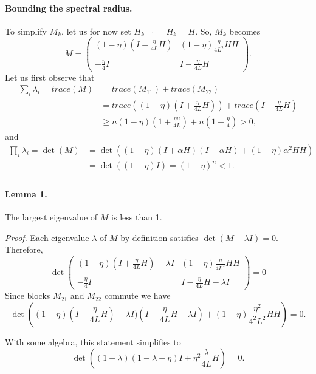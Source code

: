 \documentclass{article}
\begin{document}
\paragraph{Bounding the spectral radius.}
To simplify $M_k$, let us for now set $\bar H_{k-1}=H_k=H$.  So, $M_k$ becomes
\[
M = \begin{pmatrix} (1-\eta)(I+\displaystyle\frac{\eta}{4L} H) & \displaystyle(1-\eta)\frac{\eta}{4L^2} HH\\ 
 \\
                   -\displaystyle\frac{\eta}{4}I  & I-\displaystyle\frac{\eta}{4L} H \end{pmatrix}.                  
\]
Let us first observe that 
\begin{align*}
\sum_i \lambda_i = trace(M) &= trace(M_{11})+trace(M_{22})\\
&=trace((1-\eta)(I+\frac{\eta}{4L} H))+trace(I-\frac{\eta}{4L} H)\\
&\geq n(1-\eta)(1+\frac{\eta\mu}{4L})+n(1-\frac{\eta}{4})>0,
\end{align*}
and
\begin{align*}
\prod_i \lambda_i = \det(M) &= \det\left((1-\eta)(I+\alpha H)(I-\alpha H) + (1-\eta)\alpha^2 HH\right)\\
&=\det\left((1-\eta)I\right) = (1-\eta)^n<1.\\
\end{align*}

\bigskip
\paragraph{Lemma 1.} The largest eigenvalue of $M$ is less than 1.  

\bigskip

\noindent
\textit{Proof.} Each eigenvalue $\lambda$ of $M$ by definition satisfies $\det(M-\lambda I)=0$.  Therefore,
\[
 \det \begin{pmatrix} (1-\eta)(I+\displaystyle\frac{\eta}{4L} H)-\lambda I & \displaystyle(1-\eta)\frac{\eta}{4L^2} HH\\ 
 \\
                   -\displaystyle\frac{\eta}{4}I  & I-\displaystyle\frac{\eta}{4L} H -\lambda I  \end{pmatrix}=0
\]
Since blocks $M_{21}$ and $M_{22}$ commute we have
\[
 \det\left((1-\eta)(I+\frac{\eta}{4L} H)-\lambda I)(I-\frac{\eta}{4L} H -\lambda I) + (1-\eta)\frac{\eta^2}{4^2L^2} HH \right)=0.
\]

With some algebra, this statement simplifies to 
\[
 \det\left((1-\lambda)(1-\lambda-\eta)I + \eta^2 \frac{\lambda}{4L}H \right)=0.
\]
\end{document}

